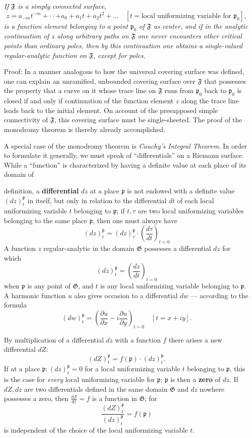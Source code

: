 \documentclass{article}
\begin{document}
\emph{If $\mathfrak{F}$ is a simply connected surface,}
\[ z = a_{-m} t^{-m} + \cdot\cdot + a_0 + a_1 t + a_2 t^2 + \dots \quad [t = \text{local uniformizing variable for } \mathfrak{p}_0], \]
\emph{is a function element belonging to a point $\mathfrak{p}_0$ of $\mathfrak{F}$ as center, and if in the analytic continuation of $z$ along arbitrary paths on $\mathfrak{F}$ one never encounters other critical points than ordinary poles, then by this continuation one obtains a single-valued regular-analytic function on $\mathfrak{F}$, except for poles.}

Proof: In a manner analogous to how the universal covering surface was defined, one can explain an unramified, unbounded covering surface over $\mathfrak{F}$ that possesses the property that a curve on it whose trace line on $\mathfrak{F}$ runs from $\mathfrak{p}_0$ back to $\mathfrak{p}_0$ is closed if and only if continuation of the function element $z$ along the trace line leads back to the initial element. On account of the presupposed simple connectivity of $\mathfrak{F}$, this covering surface must be single-sheeted. The proof of the monodromy theorem is thereby already accomplished.

A special case of the monodromy theorem is \emph{Cauchy's Integral Theorem}. In order to formulate it generally, we must speak of ``differentials'' on a Riemann surface. While a ``function'' is characterized by having a definite value at each place of its domain of

definition, a \textbf{differential} $dz$ at a place $\mathfrak{p}$ is not endowed with a definite value $(dz)_t^\mathfrak{p}$ in itself, but only in relation to the differential $dt$ of each local uniformizing variable $t$ belonging to $\mathfrak{p}$; if $t, \tau$ are two local uniformizing variables belonging to the same place $\mathfrak{p}$, then one must always have
\[ (dz)_t^\mathfrak{p} = (dz)_\tau^\mathfrak{p} \cdot \left(\frac{d\tau}{dt}\right)_{t = 0} \]
A function $z$ regular-analytic in the domain $\mathfrak{G}$ possesses a differential $dz$ for which
\[ (dz)_t^\mathfrak{p} = \left(\frac{dz}{dt}\right)_{t = 0} \]
when $\mathfrak{p}$ is any point of $\mathfrak{G}$, and $t$ is any local uniformizing variable belonging to $\mathfrak{p}$. A harmonic function $u$ also gives occasion to a differential $dw$ --- according to the formula
\[ (dw)_t^\mathfrak{p} = \left(\frac{\partial u}{\partial x} - i \frac{\partial u}{\partial y}\right)_{t = 0} \quad [t = x + iy]. \]

By multiplication of a differential $dz$ with a function $f$ there arises a new differential $dZ$:
\[ (dZ)_t^\mathfrak{p} = f(\mathfrak{p}) \cdot (dz)_t^\mathfrak{p}. \]
If at a place $\mathfrak{p}\colon (dz)_t^\mathfrak{p} = 0$ for a local uniformizing variable $t$ belonging to $\mathfrak{p}$, this is the case for \emph{every} local uniformizing variable for $\mathfrak{p}$; $\mathfrak{p}$ is then a \textbf{zero} of $dz$. If $dZ, dz$ are two differentials defined in the same domain $\mathfrak{G}$ and $dz$ nowhere possesses a zero, then $\frac{dZ}{dz} = f$ is a function in $\mathfrak{G}$; for
\[ \frac{(dZ)_t^\mathfrak{p}}{(dz)_t^\mathfrak{p}} = f(\mathfrak{p}) \]
is independent of the choice of the local uniformizing variable $t$.
\end{document}
